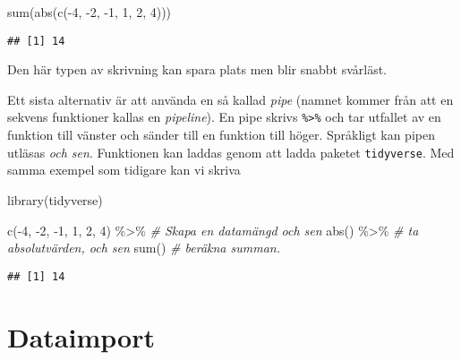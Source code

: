 \documentclass[
]{book}
\newenvironment{Shaded}{\begin{snugshade}}{\end{snugshade}}
\newcommand{\CommentTok}[1]{\textcolor[rgb]{0.56,0.35,0.01}{\textit{#1}}}
\newcommand{\DecValTok}[1]{\textcolor[rgb]{0.00,0.00,0.81}{#1}}
\newcommand{\FunctionTok}[1]{\textcolor[rgb]{0.00,0.00,0.00}{#1}}
\newcommand{\NormalTok}[1]{#1}
\newcommand{\SpecialCharTok}[1]{\textcolor[rgb]{0.00,0.00,0.00}{#1}}
\theoremstyle{definition}
\theoremstyle{definition}
\theoremstyle{definition}
\theoremstyle{definition}
\theoremstyle{remark}
\begin{document}
\begin{Shaded}
\begin{Highlighting}[]
\FunctionTok{sum}\NormalTok{(}\FunctionTok{abs}\NormalTok{(}\FunctionTok{c}\NormalTok{(}\SpecialCharTok{{-}}\DecValTok{4}\NormalTok{, }\SpecialCharTok{{-}}\DecValTok{2}\NormalTok{, }\SpecialCharTok{{-}}\DecValTok{1}\NormalTok{, }\DecValTok{1}\NormalTok{, }\DecValTok{2}\NormalTok{, }\DecValTok{4}\NormalTok{)))}
\end{Highlighting}
\end{Shaded}

\begin{verbatim}
## [1] 14
\end{verbatim}

Den här typen av skrivning kan spara plats men blir snabbt svårläst.

Ett sista alternativ är att använda en så kallad \emph{pipe} (namnet kommer från att en sekvens funktioner kallas en \emph{pipeline}). En pipe skrivs \texttt{\%\textgreater{}\%} och tar utfallet av en funktion till vänster och sänder till en funktion till höger. Språkligt kan pipen utläsas \emph{och sen}. Funktionen kan laddas genom att ladda paketet \texttt{tidyverse}. Med samma exempel som tidigare kan vi skriva

\begin{Shaded}
\begin{Highlighting}[]
\FunctionTok{library}\NormalTok{(tidyverse)}

\FunctionTok{c}\NormalTok{(}\SpecialCharTok{{-}}\DecValTok{4}\NormalTok{, }\SpecialCharTok{{-}}\DecValTok{2}\NormalTok{, }\SpecialCharTok{{-}}\DecValTok{1}\NormalTok{, }\DecValTok{1}\NormalTok{, }\DecValTok{2}\NormalTok{, }\DecValTok{4}\NormalTok{) }\SpecialCharTok{\%\textgreater{}\%}  \CommentTok{\# Skapa en datamängd och sen}
  \FunctionTok{abs}\NormalTok{() }\SpecialCharTok{\%\textgreater{}\%}                 \CommentTok{\# ta absolutvärden, och sen}
  \FunctionTok{sum}\NormalTok{()                     }\CommentTok{\# beräkna summan.}
\end{Highlighting}
\end{Shaded}

\begin{verbatim}
## [1] 14
\end{verbatim}

\hypertarget{dataimport}{%
\chapter{Dataimport}\label{dataimport}}
\end{document}
